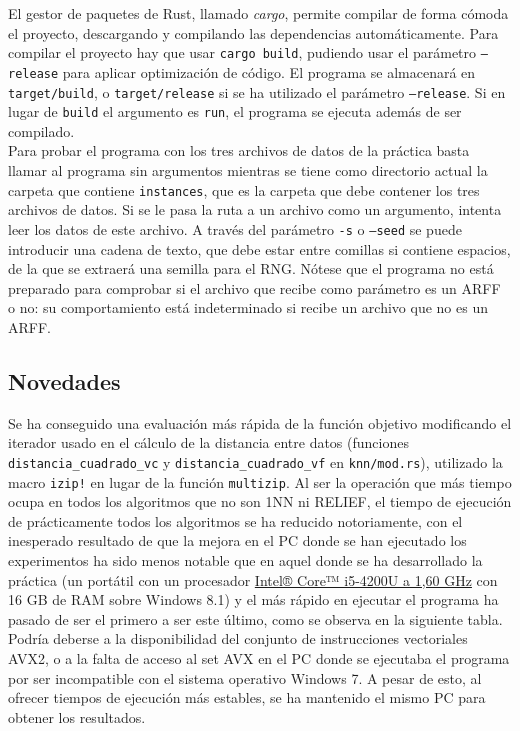 \documentclass{article}
\begin{document}
El gestor de paquetes de Rust, llamado \textit{cargo}, permite compilar de forma cómoda el proyecto, descargando y compilando las dependencias automáticamente. Para compilar el proyecto hay que usar \texttt{cargo build}, pudiendo usar el parámetro \texttt{--release} para aplicar optimización de código. El programa se almacenará en \texttt{target/build}, o \texttt{target/release} si se ha utilizado el parámetro \texttt{--release}. Si en lugar de \texttt{build} el argumento es \texttt{run}, el programa se ejecuta además de ser compilado. \\

Para probar el programa con los tres archivos de datos de la práctica basta llamar al programa sin argumentos mientras se tiene como directorio actual la carpeta que contiene \texttt{instances}, que es la carpeta que debe contener los tres archivos de datos. Si se le pasa la ruta a un archivo como un argumento, intenta leer los datos de este archivo. A través del parámetro \texttt{-s} o \texttt{--seed} se puede introducir una cadena de texto, que debe estar entre comillas si contiene espacios, de la que se extraerá una semilla para el RNG. Nótese que el programa no está preparado para comprobar si el archivo que recibe como parámetro es un ARFF o no: su comportamiento está indeterminado si recibe un archivo que no es un ARFF.

\subsection*{Novedades}

Se ha conseguido una evaluación más rápida de la función objetivo modificando el iterador usado en el cálculo de la distancia entre datos (funciones \texttt{distancia\_cuadrado\_vc} y \texttt{distancia\_cuadrado\_vf} en \texttt{knn/mod.rs}), utilizado la macro \texttt{izip!} en lugar de la función \texttt{multizip}. Al ser la operación que más tiempo ocupa en todos los algoritmos que no son 1NN ni RELIEF, el tiempo de ejecución de prácticamente todos los algoritmos se ha reducido notoriamente, con el inesperado resultado de que la mejora en el PC donde se han ejecutado los experimentos ha sido menos notable que en aquel donde se ha desarrollado la práctica (un portátil con un procesador \href{https://ark.intel.com/es-es/products/75459/Intel-Core-i5-4200U-Processor-3M-Cache-up-to-2_60-GHz}{Intel® Core™ i5-4200U a 1,60 GHz} con 16 GB de RAM sobre Windows 8.1) y el más rápido en ejecutar el programa ha pasado de ser el primero a ser este último, como se observa en la siguiente tabla. Podría deberse a la disponibilidad del conjunto de instrucciones vectoriales AVX2, o a la falta de acceso al set AVX en el PC donde se ejecutaba el programa por ser incompatible con el sistema operativo Windows 7. A pesar de esto, al ofrecer tiempos de ejecución más estables, se ha mantenido el mismo PC para obtener los resultados.
\end{document}

